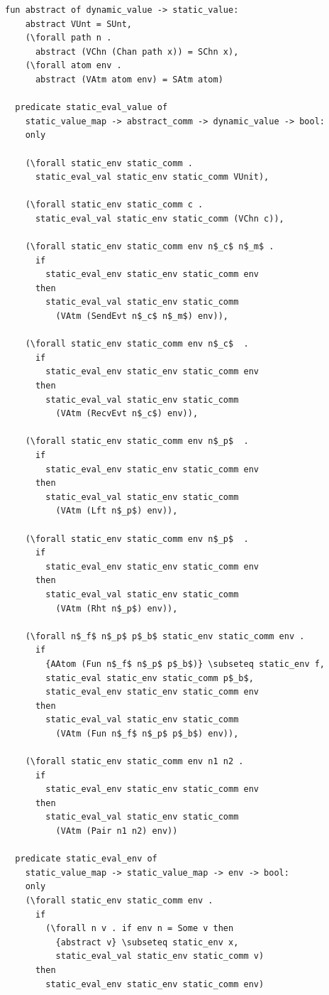 \documentclass[10pt]{article}
\begin{document}
\begin{lstlisting}[language=logic, mathescape]
  fun abstract of dynamic_value -> static_value:
    abstract VUnt = SUnt, 
    (\forall path n . 
      abstract (VChn (Chan path x)) = SChn x),
    (\forall atom env .
      abstract (VAtm atom env) = SAtm atom)

  predicate static_eval_value of
    static_value_map -> abstract_comm -> dynamic_value -> bool: 
    only

    (\forall static_env static_comm .
      static_eval_val static_env static_comm VUnit),

    (\forall static_env static_comm c .
      static_eval_val static_env static_comm (VChn c)),

    (\forall static_env static_comm env n$_c$ n$_m$ .
      if
        static_eval_env static_env static_comm env
      then
        static_eval_val static_env static_comm
          (VAtm (SendEvt n$_c$ n$_m$) env)),

    (\forall static_env static_comm env n$_c$  .
      if
        static_eval_env static_env static_comm env
      then
        static_eval_val static_env static_comm
          (VAtm (RecvEvt n$_c$) env)),

    (\forall static_env static_comm env n$_p$  .
      if
        static_eval_env static_env static_comm env
      then
        static_eval_val static_env static_comm
          (VAtm (Lft n$_p$) env)),
        
    (\forall static_env static_comm env n$_p$  .
      if
        static_eval_env static_env static_comm env
      then
        static_eval_val static_env static_comm
          (VAtm (Rht n$_p$) env)),

    (\forall n$_f$ n$_p$ p$_b$ static_env static_comm env .
      if
        {AAtom (Fun n$_f$ n$_p$ p$_b$)} \subseteq static_env f, 
        static_eval static_env static_comm p$_b$, 
        static_eval_env static_env static_comm env
      then
        static_eval_val static_env static_comm
          (VAtm (Fun n$_f$ n$_p$ p$_b$) env)),

    (\forall static_env static_comm env n1 n2 .
      if
        static_eval_env static_env static_comm env
      then
        static_eval_val static_env static_comm
          (VAtm (Pair n1 n2) env))

  predicate static_eval_env of
    static_value_map -> static_value_map -> env -> bool:
    only 
    (\forall static_env static_comm env .
      if
        (\forall n v . if env n = Some v then
          {abstract v} \subseteq static_env x,
          static_eval_val static_env static_comm v)
      then 
        static_eval_env static_env static_comm env)


\end{lstlisting}
\end{document}
